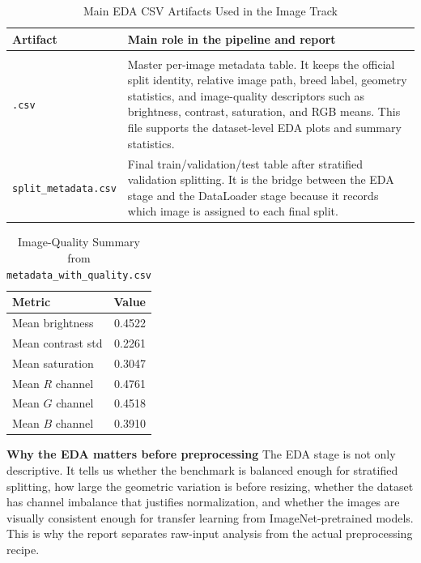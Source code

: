 \documentclass[twoside,final]{hcmut-report}
\begin{document}
\begin{table}[H]
\centering
\caption{Main EDA CSV Artifacts Used in the Image Track}
\small
\begin{tabularx}{0.96\textwidth}{>{\raggedright\arraybackslash}p{4.2cm} >{\raggedright\arraybackslash}X}
\toprule
\textbf{Artifact} & \textbf{Main role in the pipeline and report} \\
\midrule
\begin{tabular}[t]{@{}l@{}}\texttt{metadata\_with\_quality}\\\texttt{.csv}\end{tabular} & Master per-image metadata table. It keeps the official split identity, relative image path, breed label, geometry statistics, and image-quality descriptors such as brightness, contrast, saturation, and RGB means. This file supports the dataset-level EDA plots and summary statistics. \\
\texttt{split\_metadata.csv} & Final train/validation/test table after stratified validation splitting. It is the bridge between the EDA stage and the DataLoader stage because it records which image is assigned to each final split. \\
\bottomrule
\end{tabularx}
\label{tab:stanford_dogs_eda_artifacts}
\end{table}

\begin{table}[H]
\centering
\caption{Image-Quality Summary from \texttt{metadata\_with\_quality.csv}}
\begin{tabular}{lr}
\toprule
\textbf{Metric} & \textbf{Value} \\
\midrule
Mean brightness & 0.4522 \\
Mean contrast std & 0.2261 \\
Mean saturation & 0.3047 \\
Mean $R$ channel & 0.4761 \\
Mean $G$ channel & 0.4518 \\
Mean $B$ channel & 0.3910 \\
\bottomrule
\end{tabular}
\label{tab:stanford_dogs_quality_stats}
\end{table}

\noindent \textbf{Why the EDA matters before preprocessing} The EDA stage is not only descriptive. It tells us whether the benchmark is balanced enough for stratified splitting, how large the geometric variation is before resizing, whether the dataset has channel imbalance that justifies normalization, and whether the images are visually consistent enough for transfer learning from ImageNet-pretrained models. This is why the report separates raw-input analysis from the actual preprocessing recipe.\\
\end{document}
